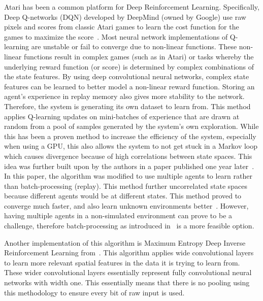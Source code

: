 \documentclass[12pt,american]{report}
\begin{document}
	Atari has been a common platform for Deep Reinforcement Learning. Specifically, Deep Q-networks (DQN) developed by DeepMind (owned by Google) use raw pixels and scores from classic Atari games to learn the cost function for the games to maximize the score~\cite{mnih2015human}. Most neural network implementations of Q-learning are unstable or fail to converge due to non-linear functions. These non-linear functions result in complex games (such as in Atari) or tasks whereby the underlying reward function (or score) is determined by complex combinations of the state features. By using deep convolutional neural networks, complex state features can be learned to better model a non-linear reward function. Storing an agent's experience in replay memory also gives more stability to the network. Therefore, the system is generating its own dataset to learn from. This method applies Q-learning updates on mini-batches of experience that are drawn at random from a pool of samples generated by the system's own exploration.  While this has been a proven method to increase the efficiency of the system, especially when using a GPU, this also allows the system to not get stuck in a Markov loop which causes divergence because of high correlations between state spaces.  This idea was further built upon by the authors in a paper published one year later~\cite{mnih2016asynchronous}. In this paper, the algorithm was modified to use multiple agents to learn rather than batch-processing (replay). This method further uncorrelated state spaces because different agents would be at different states. This method proved to converge much faster, and also learn unknown environments better~\cite{mnih2016asynchronous}. However, having multiple agents in a non-simulated environment can prove to be a challenge, therefore batch-processing as introduced in~\cite{mnih2015human} is a more feasible option. 

Another implementation of this algorithm is Maximum Entropy Deep Inverse Reinforcement Learning from~\cite{wulfmeier2015maximum}. This algorithm applies wide convolutional layers to learn more relevant spatial features in the data it is trying to learn from. These wider convolutional layers essentially represent fully convolutional neural networks with width one. This essentially means that there is no pooling using this methodology to ensure every bit of raw input is used. 
	
\end{document}
